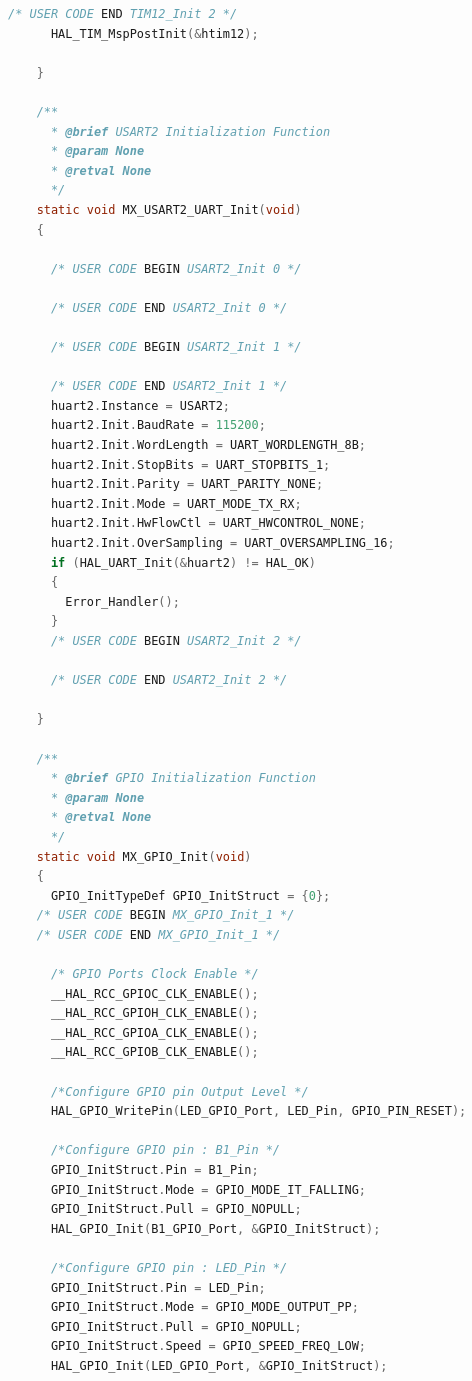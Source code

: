 \begin{lstlisting}[language=C, caption=メインコード(main.c)]
      /* USER CODE END TIM12_Init 2 */
      HAL_TIM_MspPostInit(&htim12);
    
    }
    
    /**
      * @brief USART2 Initialization Function
      * @param None
      * @retval None
      */
    static void MX_USART2_UART_Init(void)
    {
    
      /* USER CODE BEGIN USART2_Init 0 */
    
      /* USER CODE END USART2_Init 0 */
    
      /* USER CODE BEGIN USART2_Init 1 */
    
      /* USER CODE END USART2_Init 1 */
      huart2.Instance = USART2;
      huart2.Init.BaudRate = 115200;
      huart2.Init.WordLength = UART_WORDLENGTH_8B;
      huart2.Init.StopBits = UART_STOPBITS_1;
      huart2.Init.Parity = UART_PARITY_NONE;
      huart2.Init.Mode = UART_MODE_TX_RX;
      huart2.Init.HwFlowCtl = UART_HWCONTROL_NONE;
      huart2.Init.OverSampling = UART_OVERSAMPLING_16;
      if (HAL_UART_Init(&huart2) != HAL_OK)
      {
        Error_Handler();
      }
      /* USER CODE BEGIN USART2_Init 2 */
    
      /* USER CODE END USART2_Init 2 */
    
    }
    
    /**
      * @brief GPIO Initialization Function
      * @param None
      * @retval None
      */
    static void MX_GPIO_Init(void)
    {
      GPIO_InitTypeDef GPIO_InitStruct = {0};
    /* USER CODE BEGIN MX_GPIO_Init_1 */
    /* USER CODE END MX_GPIO_Init_1 */
    
      /* GPIO Ports Clock Enable */
      __HAL_RCC_GPIOC_CLK_ENABLE();
      __HAL_RCC_GPIOH_CLK_ENABLE();
      __HAL_RCC_GPIOA_CLK_ENABLE();
      __HAL_RCC_GPIOB_CLK_ENABLE();
    
      /*Configure GPIO pin Output Level */
      HAL_GPIO_WritePin(LED_GPIO_Port, LED_Pin, GPIO_PIN_RESET);
    
      /*Configure GPIO pin : B1_Pin */
      GPIO_InitStruct.Pin = B1_Pin;
      GPIO_InitStruct.Mode = GPIO_MODE_IT_FALLING;
      GPIO_InitStruct.Pull = GPIO_NOPULL;
      HAL_GPIO_Init(B1_GPIO_Port, &GPIO_InitStruct);
    
      /*Configure GPIO pin : LED_Pin */
      GPIO_InitStruct.Pin = LED_Pin;
      GPIO_InitStruct.Mode = GPIO_MODE_OUTPUT_PP;
      GPIO_InitStruct.Pull = GPIO_NOPULL;
      GPIO_InitStruct.Speed = GPIO_SPEED_FREQ_LOW;
      HAL_GPIO_Init(LED_GPIO_Port, &GPIO_InitStruct);
    

\end{lstlisting}
